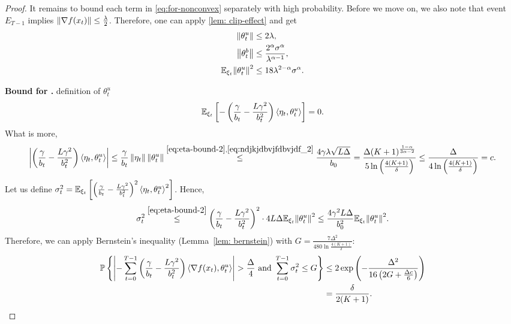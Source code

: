 \documentclass{article}
\begin{document}
\begin{proof}
    
    It remains to bound each term in \eqref{eq:for-nonconvex} separately with high probability. Before we move on, we also note that event $E_{T-1}$ implies $\left\lVert\nabla f(x_t)\right\rVert \leq \frac{\lambda}{2}$. Therefore, one can apply \cref{lem: clip-effect} and get
    \begin{align}
        \left\lVert\theta_t^u\right\rVert &\leq 2\lambda, \label{eq:ndjkjdbvjfdbvjdf_2}\\
        \left\lVert\theta_t^b\right\rVert &\leq \frac{2^\alpha \sigma^\alpha}{\lambda^{\alpha - 1}}, \label{eq:ndjkvjfbdvjfhbvdbfvdf_2}\\
        {\mathbb E}_{\xi_t}{\left\lVert\theta_t^u\right\rVert}^2 &\leq 18\lambda^{2 - \alpha}\sigma^\alpha. \label{eq:djbjdbvjdbhvjbdfhjvbdhfbdf_2}
    \end{align}
    
    \textbf{Bound for \circledOne.}  definition of $\theta_t^u$ 
    \begin{align*}
        {\mathbb E}_{\xi_t}\left[-\left(\frac{\gamma}{b_t} - \frac{L\gamma^2}{b_t^2}\right)\left \langle \eta_t, \theta_t^u \right \rangle\right] = 0.
    \end{align*}
    What is more, 
    \begin{align*}
        \left|\left(\frac{\gamma}{b_t} - \frac{L\gamma^2}{b_t^2}\right)\left \langle \eta_t, \theta_t^u \right \rangle\right| \leq \frac{\gamma}{b_t}\left\lVert\eta_t\right\rVert\left\lVert\theta_t^u\right\rVert \overset{\eqref{eq:eta-bound-2},\eqref{eq:ndjkjdbvjfdbvjdf_2}}{\leq} \frac{4\gamma \lambda \sqrt{L\Delta}}{b_0} = \frac{\Delta (K+1)^{\frac{1 - \alpha}{3\alpha - 2}}}{5 \ln\left(\frac{4(K+1)}{\delta}\right)} \leq \frac{\Delta }{4 \ln\left(\frac{4(K+1)}{\delta}\right)} = c.
    \end{align*}
    Let us define $\sigma^2_t = {\mathbb E}_{\xi_t}\left[\left(\frac{\gamma}{b_t} - \frac{L\gamma^2}{b_t^2}\right)^2\left \langle \eta_t, \theta_t^u \right \rangle^2\right]$. Hence,
    \begin{align}
        \sigma_t^2 \overset{\eqref{eq:eta-bound-2}}{\leq} \left(\frac{\gamma}{b_t} - \frac{L\gamma^2}{b_t^2}\right)^2 \cdot 4L\Delta {\mathbb E}_{\xi_t}{\left\lVert\theta_t^u\right\rVert}^2 \leq  \frac{4\gamma^2 L\Delta}{b_0^2}{\mathbb E}_{\xi_t}{\left\lVert\theta_t^u\right\rVert}^2.\label{eq:hdjbjbdcjbdcjdcbjd}
    \end{align}
    Therefore, we can apply Bernstein's inequality (Lemma~\ref{lem: bernstein}) with $G = \frac{7\Delta^2}{480\ln\frac{4(K+1)}{\delta}}$:
    \begin{align*}
        \mathbb{P}\left\{\left|- \sum\limits_{t=0}^{T-1}\left(\frac{\gamma}{b_t} - \frac{L\gamma^2}{b_t^2}\right)\ev{\nabla f(x_t), \theta_t^u}\right| > \frac{\Delta}{4} \text{ and } \sum\limits_{t=0}^{T-1} \sigma_t^2 \leq G\right\} &\leq 2\exp\left(-\frac{\Delta^2}{16\left(2G + \frac{\Delta c}{6}\right)}\right) \\&= \frac{\delta}{2(K+1)}.

\end{align*}
\end{proof}
\end{document}
